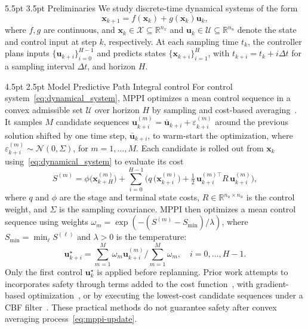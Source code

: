 \documentclass[letterpaper, 10 pt, conference]{ieeeconf}
\makeatletter
\newcommand{\x}{\mathbf{x}}
\renewcommand{\u}{\mathbf{u}}
\newcommand{\uk}{\mathbf{u}_{k}}
\renewcommand{\section}{%
  \@startsection{section}{1}{\z@}%
  {5.5pt}%
  {3.5pt}%
  {\normalfont\normalsize\centering\scshape}}
\renewcommand{\subsection}{%
  \@startsection{subsection}{2}{\z@}%
  {4.5pt}%
  {2.5pt}%
  {\normalfont\normalsize\itshape}}
\makeatother
\begin{document}
\section{Preliminaries}
We study discrete-time dynamical systems of the form
\begin{equation}
\x_{k+1}=f(\x_k)+g(\x_k)\u_k,
\label{eq:dynamical_system}
\end{equation}
where $f,g$ are continuous, and $\x_k\in\mathcal X\subseteq\mathbb R^{n_x}$ and $\u_k\in\mathcal U\subseteq\mathbb R^{n_u}$ denote the state and control input at step $k$, respectively. At each sampling time $t_k$, the controller plans inputs $\{\u_{k+i}\}_{i=0}^{H-1}$ and predicts states $\{\x_{k+i}\}_{i=1}^{H}$, with $t_{k+i}\!=\!t_k\!+\!i\Delta t$ for a sampling interval $\Delta t$, and horizon $H$.

\subsection{Model Predictive Path Integral control}
For control system~\eqref{eq:dynamical_system}, MPPI optimizes a mean control sequence in a convex admissible set $\mathcal U$ over horizon $H$ by sampling and cost-based averaging~\cite{williams2016aggressive}.
It samples $M$ candidate sequences $\mathbf u^{(m)}_{k+i}=\bar{\mathbf u}_{k+i}+\varepsilon^{(m)}_{k+i}$ around the previous solution shifted by one time step, $\bar{\mathbf u}_{k+i}$, to warm-start the optimization, where $\varepsilon^{(m)}_{k+i}\sim\mathcal N(0,\Sigma)$, for $m\!=\!1,\!\ldots,\!M$.
Each candidate is rolled out from $\x_k$ using~\eqref{eq:dynamical_system} to evaluate its cost
\begin{equation}
S^{(m)}\!=\!\phi\bigl(\mathbf{x}^{(m)}_{k+H}\bigr)
\!+\!\!\sum_{i=0}^{H-1}\Big(\!q\,\!\bigl(\mathbf{x}^{(m)}_{k+i}\bigr)
\!+\!\tfrac{1}{2}\,\mathbf{u}^{(m)\top}_{k+i}R\,\mathbf{u}^{(m)}_{k+i}\Big),
\label{eq:mppicost}
\end{equation}
where $q$ and $\phi$ are the stage and terminal state costs, $R\in\mathbb R^{n_u\times n_u}$ is the control weight, and $\Sigma$ is the sampling covariance.
MPPI then optimizes a mean control sequence using weights $\omega_m=\exp(-(S^{(m)}-S_{\min})/\lambda)$, where $S_{\min}=\min_\ell S^{(\ell)}$ and $\lambda>0$ is the temperature:
\begin{equation}
\mathbf u^\star_{k+i}
=
\sum_{m=1}^{M}\omega_m\mathbf u^{(m)}_{k+i}\Big/
\sum_{m=1}^{M}\omega_m,
\quad i=0,\ldots,H-1.
\label{eq:mppi-update}
\end{equation}
Only the first control $\uk^\star$ is applied before replanning.
Prior work attempts to incorporates safety through terms added to the cost function~\cite{williams2016aggressive}, with gradient-based optimization~\cite{yin2023shield}, or by executing the lowest-cost candidate sequences under a CBF filter~\cite{rabiee2024guaranteed}. 
These practical methods do not guarantee safety after convex averaging process~\eqref{eq:mppi-update}.
\end{document}
